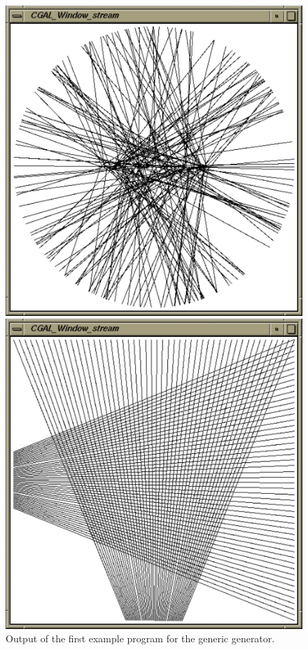 \begin{ccTexOnly}
  \begin{figure}
    \noindent
    \hspace*{0.025\textwidth}%
    \begin{minipage}[t]{0.45\textwidth}%
      \includegraphics[width=\textwidth]{Generator/Segment_generator_prog1}
      \caption{Output of the first example program for the generic generator.}
      \label{figureSegmentGenerator}
    \end{minipage}%
    \hspace*{0.05\textwidth}%
    \begin{minipage}[t]{0.45\textwidth}%
      \includegraphics[width=\textwidth]{Generator/Segment_generator_prog2}

\end{minipage}
\end{figure}
\end{ccTexOnly}
